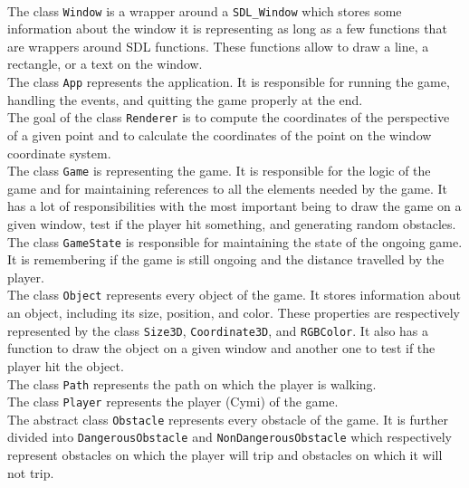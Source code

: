 \documentclass[a4paper, 11pt, oneside]{article}
\begin{document}
\paragraph{}The class \texttt{Window} is a wrapper around a \texttt{SDL\_Window} which stores some information about the window it is representing as long as a few functions that are wrappers around SDL functions. These functions allow to draw a line, a rectangle, or a text on the window.\\ \newline
The class \texttt{App} represents the application. It is responsible for running the game, handling the events, and quitting the game properly at the end.\\ \newline
The goal of the class \texttt{Renderer} is to compute the coordinates of the perspective of a given point and to calculate the coordinates of the point on the window coordinate system.\\ \newline
The class \texttt{Game} is representing the game. It is responsible for the logic of the game and for maintaining references to all the elements needed by the game. It has a lot of responsibilities with the most important being to draw the game on a given window, test if the player hit something, and generating random obstacles.\\ \newline
The class \texttt{GameState} is responsible for maintaining the state of the ongoing game. It is remembering if the game is still ongoing and the distance travelled by the player.\\ \newline
The class \texttt{Object} represents every object of the game. It stores information about an object, including its size, position, and color. These properties are respectively represented by the class \texttt{Size3D}, \texttt{Coordinate3D}, and \texttt{RGBColor}. It also has a function to draw the object on a given window and another one to test if the player hit the object.\\
The class \texttt{Path} represents the path on which the player is walking.\\ \newline
The class \texttt{Player} represents the player (Cymi) of the game.\\ \newline
The abstract class \texttt{Obstacle} represents every obstacle of the game. It is further divided into \texttt{DangerousObstacle} and \texttt{NonDangerousObstacle} which respectively represent obstacles on which the player will trip and obstacles on which it will not trip.\\ \newline
\end{document}
